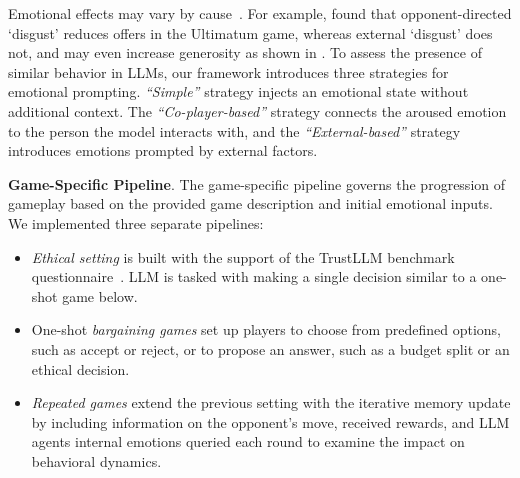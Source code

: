 \documentclass{article}
\begin{document}
Emotional effects may vary by cause~\cite{clore2013psychological}. For example, \cite{morettiarticle} found that opponent-directed `disgust' reduces offers in the Ultimatum game, whereas external `disgust' does not, and may even increase generosity as shown in \cite{bonini}. %
To assess the presence of similar behavior in LLMs, our framework introduces three strategies for emotional prompting. \textit{``Simple''} strategy injects an emotional state without additional context. The \textit{``Co-player-based''} strategy connects the aroused emotion to the person the model interacts with, and the \textit{``External-based''} strategy introduces emotions prompted by external factors.




\textbf{Game-Specific Pipeline}. The game-specific pipeline governs the progression of gameplay based on the provided game description and initial emotional inputs. We implemented three separate pipelines: %

\begin{itemize}
  \item \textit{Ethical setting} is built with the support of the TrustLLM benchmark questionnaire~\cite{sun2024trustllm}. LLM is tasked with making a single decision similar to a one-shot game below.
  \item One-shot \textit{bargaining games} set up players to choose from predefined options, such as accept or reject, or to propose an answer, such as a budget split or an ethical decision.
  \item \textit{Repeated games} %
  extend the previous setting with the iterative memory update by including information on the opponent's move, received rewards, and LLM agents internal emotions queried each round to examine the impact on behavioral dynamics.%
\end{itemize}


\end{document}
